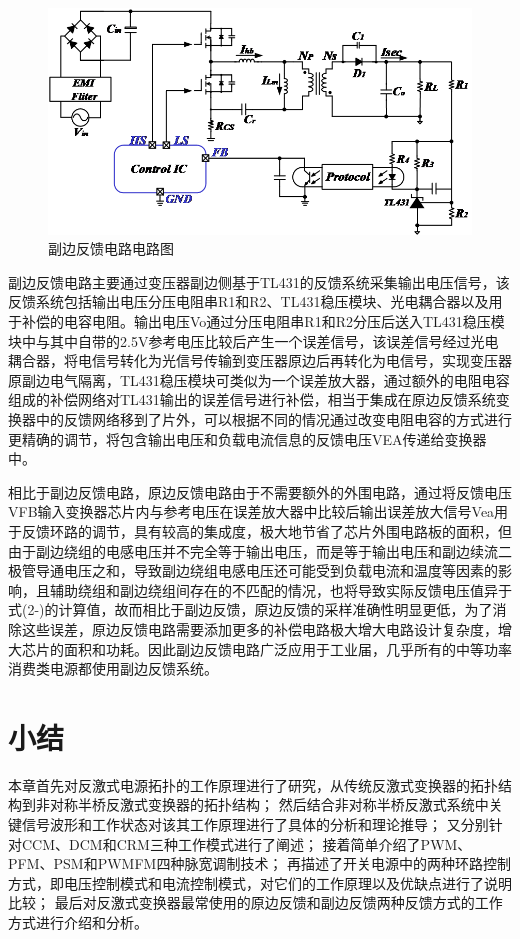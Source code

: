 \begin{figure}[htbp] 
    \centering
    \includegraphics[width=0.8\linewidth]{figures/副边反馈电路图.png}
    \caption{副边反馈电路电路图}
    \label{fig:副边反馈电路电路图}
\end{figure}

副边反馈电路主要通过变压器副边侧基于TL431的反馈系统采集输出电压信号，该反馈系统包括输出电压分压电阻串R1和R2、TL431稳压模块、光电耦合器以及用于补偿的电容电阻。输出电压Vo通过分压电阻串R1和R2分压后送入TL431稳压模块中与其中自带的2.5V参考电压比较后产生一个误差信号，该误差信号经过光电耦合器，将电信号转化为光信号传输到变压器原边后再转化为电信号，实现变压器原副边电气隔离，TL431稳压模块可类似为一个误差放大器，通过额外的电阻电容组成的补偿网络对TL431输出的误差信号进行补偿，相当于集成在原边反馈系统变换器中的反馈网络移到了片外，可以根据不同的情况通过改变电阻电容的方式进行更精确的调节，将包含输出电压和负载电流信息的反馈电压VEA传递给变换器中。

相比于副边反馈电路，原边反馈电路由于不需要额外的外围电路，通过将反馈电压VFB输入变换器芯片内与参考电压在误差放大器中比较后输出误差放大信号Vea用于反馈环路的调节，具有较高的集成度，极大地节省了芯片外围电路板的面积，但由于副边绕组的电感电压并不完全等于输出电压，而是等于输出电压和副边续流二极管导通电压之和，导致副边绕组电感电压还可能受到负载电流和温度等因素的影响，且辅助绕组和副边绕组间存在的不匹配的情况，也将导致实际反馈电压值异于式(2-)的计算值，故而相比于副边反馈，原边反馈的采样准确性明显更低，为了消除这些误差，原边反馈电路需要添加更多的补偿电路极大增大电路设计复杂度，增大芯片的面积和功耗。因此副边反馈电路广泛应用于工业届，几乎所有的中等功率消费类电源都使用副边反馈系统。



 

\section{小结}


本章首先对反激式电源拓扑的工作原理进行了研究，从传统反激式变换器的拓扑结构到非对称半桥反激式变换器的拓扑结构；
然后结合非对称半桥反激式系统中关键信号波形和工作状态对该其工作原理进行了具体的分析和理论推导；
又分别针对CCM、DCM和CRM三种工作模式进行了阐述；
接着简单介绍了PWM、PFM、PSM和PWMFM四种脉宽调制技术；
再描述了开关电源中的两种环路控制方式，即电压控制模式和电流控制模式，对它们的工作原理以及优缺点进行了说明比较；
最后对反激式变换器最常使用的原边反馈和副边反馈两种反馈方式的工作方式进行介绍和分析。

















